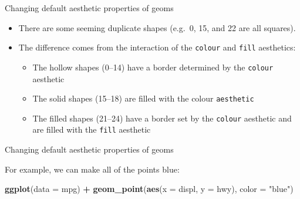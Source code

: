 \documentclass[ignorenonframetext,]{beamer}
\newenvironment{Shaded}{\begin{snugshade}}{\end{snugshade}}
\newcommand{\DataTypeTok}[1]{\textcolor[rgb]{0.13,0.29,0.53}{#1}}
\newcommand{\KeywordTok}[1]{\textcolor[rgb]{0.13,0.29,0.53}{\textbf{#1}}}
\newcommand{\NormalTok}[1]{#1}
\newcommand{\OperatorTok}[1]{\textcolor[rgb]{0.81,0.36,0.00}{\textbf{#1}}}
\newcommand{\StringTok}[1]{\textcolor[rgb]{0.31,0.60,0.02}{#1}}
\begin{document}
\begin{frame}[fragile]{Changing default aesthetic properties of geoms}
\protect\hypertarget{changing-default-aesthetic-properties-of-geoms-1}{}

\begin{itemize}
\item
  There are some seeming duplicate shapes (e.g.~0, 15, and 22 are all
  squares).
\item
  The difference comes from the interaction of the \texttt{colour} and
  \texttt{fill} aesthetics:

  \begin{itemize}
  \item
    The hollow shapes (0--14) have a border determined by the
    \texttt{colour} aesthetic
  \item
    The solid shapes (15--18) are filled with the colour
    \texttt{aesthetic}
  \item
    The filled shapes (21--24) have a border set by the \texttt{colour}
    aesthetic and are filled with the \texttt{fill} aesthetic
  \end{itemize}
\end{itemize}

\end{frame}

\begin{frame}[fragile]{Changing default aesthetic properties of geoms}
\protect\hypertarget{changing-default-aesthetic-properties-of-geoms-2}{}

For example, we can make all of the points blue:

\begin{Shaded}
\begin{Highlighting}[]
\KeywordTok{ggplot}\NormalTok{(}\DataTypeTok{data =}\NormalTok{ mpg) }\OperatorTok{+}
\StringTok{  }\KeywordTok{geom_point}\NormalTok{(}\KeywordTok{aes}\NormalTok{(}\DataTypeTok{x =}\NormalTok{ displ, }\DataTypeTok{y =}\NormalTok{ hwy), }
    \DataTypeTok{color =} \StringTok{"blue"}\NormalTok{)}
\end{Highlighting}
\end{Shaded}

\end{frame}
\end{document}
